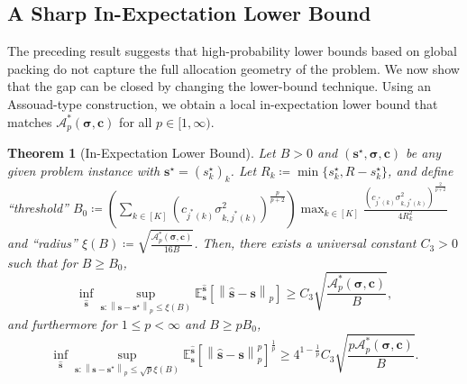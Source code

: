 \documentclass{article}
\def\vc{{\bm{c}}}
\def\vs{{\bm{s}}}
\def\gA{{\mathcal{A}}}
\newcommand{\E}{\mathbb{E}}
\theoremstyle{plain}
\newtheorem{theorem}{Theorem}[section]
\theoremstyle{definition}
\theoremstyle{plain}
\newcommand{\bignorm}[1]{\left\lVert #1 \right\rVert}
\begin{document}
\subsection{A Sharp In-Expectation Lower Bound}

The preceding result suggests that high-probability lower bounds based on global packing do not capture the full allocation geometry of the problem. We now show that the gap can be closed by changing the lower-bound technique. Using an Assouad-type construction, we obtain a local in-expectation lower bound that matches \(\gA_p^*(\bm\sigma, \vc)\) for all \(p\in[1,\infty)\).

\begin{theorem}[In-Expectation Lower Bound]
\label{thm:lower-bound-exp}
    Let $B > 0$ and $(\vs^\star, \bm\sigma, \vc)$ be any given problem instance with $\vs^\star = (s_k^\star)_k$.
    Let $R_k \coloneq \min\{s_k^\star, R - s_k^\star\}$, and define ``threshold'' $B_0 \coloneq \left( \sum_{k \in [K]} \left( c_{j^*(k)} \sigma_{k,j^*(k)}^2 \right)^{\frac{p}{p+2}} \right) \max_{k \in [K]} \frac{\left( c_{j^*(k)} \sigma_{k,j^*(k)}^2 \right)^{\frac{2}{p+2}}}{4 R_k^2}$ and ``radius'' $\xi(B) \coloneq \sqrt{\frac{\gA_p^*(\bm\sigma, \vc)}{16B}}$.
    Then, there exists a universal constant $C_3 > 0$ such that for $B \geq B_0$,
    \begin{equation}
        \inf_{\hat{\vs}} \sup_{\vs : \bignorm{\vs - \vs^\star}_p \leq \xi(B)} \E^{\hat{\vs}}_{\vs}\left[ \bignorm{\hat{\vs} - \vs}_p \right] \geq
        C_3 \sqrt{\frac{\gA_p^*(\bm\sigma, \vc)}{B}},
    \end{equation}
    and furthermore for $1 \leq p < \infty$ and $B \geq p B_0$,
    \begin{equation}
        \inf_{\hat{\vs}} \sup_{\vs : \bignorm{\vs - \vs^\star}_p \leq \sqrt{p}\xi(B)} \E^{\hat{\vs}}_{\vs}\left[ \bignorm{\hat{\vs} - \vs}_p^p \right]^{\frac{1}{p}} \geq
        4^{1 - \frac{1}{p}} C_3 \sqrt{\frac{p \gA_p^*(\bm\sigma, \vc)}{B}}.
    \end{equation}
\end{theorem}
\end{document}
